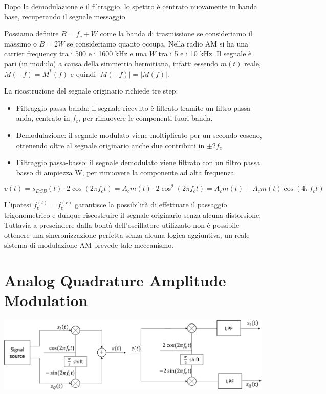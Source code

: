 Dopo la demodulazione e il filtraggio, lo spettro è centrato nuovamente in banda base, recuperando il segnale messaggio.

Possiamo definire $B = f_c + W$ come la banda di trasmissione se consideriamo il massimo o $B = 2W$ se consideriamo quanto occupa.
Nella radio AM si ha una carrier frequency tra i 500 e i 1600 kHz e una $W$ tra i 5 e i 10 kHz.
Il segnale è pari (in modulo) a causa della simmetria hermitiana, infatti essendo $m(t)$ reale, $M(-f) = M^*(f)$ e quindi $|M(-f)| = |M(f)|$.


La ricostruzione del segnale originario richiede tre step:
\begin{itemize}
  \item Filtraggio passa-banda: il segnale ricevuto è filtrato tramite un filtro passa-anda, centrato in \( f_c \), per rimuovere le componenti fuori banda.
  \item Demodulazione: il segnale modulato viene moltiplicato per un secondo coseno, ottenendo oltre al segnale originario anche due contributi in \(\pm 2f_c \)
  \item Filtraggio passa-basso: il segnale demodulato viene filtrato con un filtro passa basso di ampiezza W, per rimuovere la componente ad alta frequenza.
\end{itemize}

\begin{equation*}
    v(t) = s_{DSB}(t) \cdot 2\cos(2\pi f_c t) = A_c m(t) \cdot 2\cos^2(2\pi f_c t) = A_c m(t) + A_c m(t) \cos(4\pi f_c t)
\end{equation*}

L'ipotesi $f_c^{(t)} = f_c^{(r)}$ garantisce la possibilità di effettuare il passaggio trigonometrico e dunque riscostruire il segnale originario senza alcuna distorsione. Tuttavia a prescindere dalla bontà dell'oscillatore utilizzato non è possibile ottenere una sincronizzazione perfetta senza alcuna logica aggiuntiva, un reale sistema di modulazione AM prevede tale meccanismo.

\section*{Analog Quadrature Amplitude Modulation}

\begin{center}
    \includegraphics[width=1\textwidth]{imgs/analog_qam.png}
\end{center}

